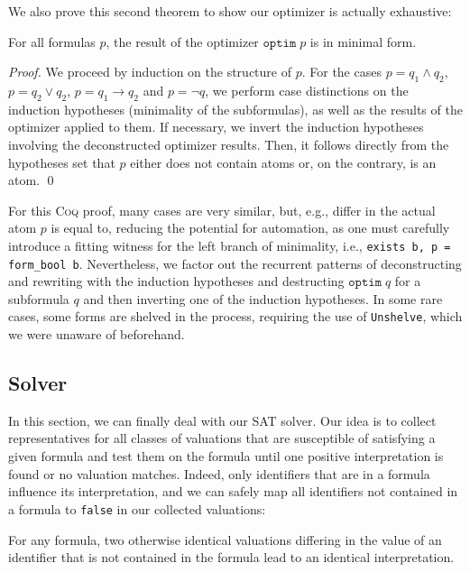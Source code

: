 We also prove this second theorem to show our optimizer is actually exhaustive:
\begin{theorem}
    For all formulas $p$, the result of the optimizer $\texttt{optim}\;p$ is in minimal form.
\end{theorem}
\begin{proof}
    We proceed by induction on the structure of $p$.
    For the cases $p = q_1 \land q_2$, $p = q_2 \lor q_2$, $p = q_1 \rightarrow q_2$ and $p = \neg q$, we perform case distinctions on the induction hypotheses (minimality of the subformulas), as well as the results of the optimizer applied to them.
    If necessary, we invert the induction hypotheses involving the deconstructed optimizer results.
    Then, it follows directly from the hypotheses set that $p$ either does not contain atoms or, on the contrary, is an atom. \qed
\end{proof}
For this \textsc{Coq} proof, many cases are very similar, but, e.g., differ in the actual atom $p$ is equal to, reducing the potential for automation, as one must carefully introduce a fitting witness for the left branch of minimality, i.e., \texttt{exists b, p = form\_bool b}.
Nevertheless, we factor out the recurrent patterns of deconstructing and rewriting with the induction hypotheses and destructing $\texttt{optim}\;q$ for a subformula $q$ and then inverting one of the induction hypotheses. In some rare cases, some forms are shelved in the process, requiring the use of \texttt{Unshelve}, which we were unaware of beforehand.

\subsection{Solver}

In this section, we can finally deal with our SAT solver.
Our idea is to collect representatives for all classes of valuations that are susceptible of satisfying a given formula and test them on the formula until one positive interpretation is found or no valuation matches.
Indeed, only identifiers that are in a formula influence its interpretation, and we can safely map all identifiers not contained in a formula to \texttt{false} in our collected valuations:
\begin{lemma}
    For any formula, two otherwise identical valuations differing in the value of an identifier that is not contained in the formula lead to an identical interpretation.
\end{lemma}

